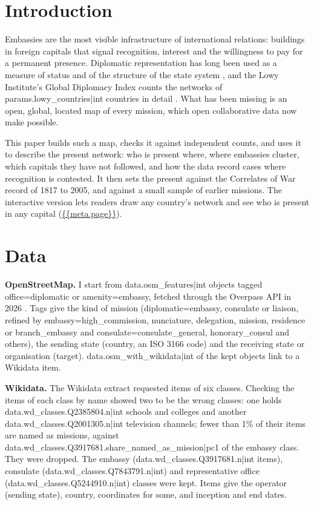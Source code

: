\documentclass[11pt,a4paper]{article}
\begin{document}
\section{Introduction}
Embassies are the most visible infrastructure of international relations: buildings in foreign capitals that signal recognition, interest and the willingness to pay for a permanent presence. Diplomatic representation has long been used as a measure of status and of the structure of the state system \citep{bayer}, and the Lowy Institute's Global Diplomacy Index counts the networks of {{params.lowy_countries|int}} countries in detail \citep{lowy}. What has been missing is an open, global, located map of every mission, which open collaborative data now make possible.

This paper builds such a map, checks it against independent counts, and uses it to describe the present network: who is present where, where embassies cluster, which capitals they have not followed, and how the data record cases where recognition is contested. It then sets the present against the Correlates of War record of 1817 to 2005, and against a small sample of earlier missions. The interactive version lets readers draw any country's network and see who is present in any capital (\url{{{meta.page}}}).

\section{Data}
\textbf{OpenStreetMap.} I start from {{data.osm_features|int}} objects tagged office=diplomatic or amenity=embassy, fetched through the Overpass API in 2026 \citep{osm}. Tags give the kind of mission (diplomatic=embassy, consulate or liaison, refined by embassy=high\_commission, nunciature, delegation, mission, residence or branch\_embassy and consulate=consulate\_general, honorary\_consul and others), the sending state (country, an ISO 3166 code) and the receiving state or organisation (target). {{data.osm_with_wikidata|int}} of the kept objects link to a Wikidata item.

\textbf{Wikidata.} The Wikidata extract \citep{wikidata} requested items of six classes. Checking the items of each class by name showed two to be the wrong classes: one holds {{data.wd_classes.Q2385804.n|int}} schools and colleges and another {{data.wd_classes.Q2001305.n|int}} television channels; fewer than 1\% of their items are named as missions, against {{data.wd_classes.Q3917681.share_named_as_mission|pc1}} of the embassy class. They were dropped. The embassy ({{data.wd_classes.Q3917681.n|int}} items), consulate ({{data.wd_classes.Q7843791.n|int}}) and representative office ({{data.wd_classes.Q5244910.n|int}}) classes were kept. Items give the operator (sending state), country, coordinates for some, and inception and end dates.
\end{document}
